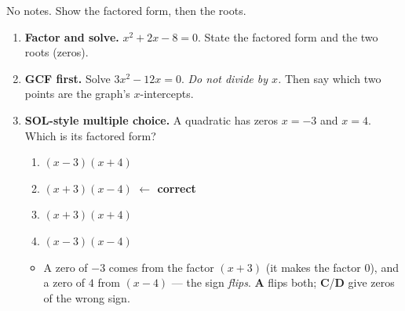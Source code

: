 \documentclass[10pt]{article}
\begin{document}

\vspace{0.12in}

No notes. Show the factored form, then the roots.

\begin{enumerate}[leftmargin=1.8em, itemsep=12pt]
  \item \textbf{Factor and solve.} $x^2+2x-8=0$. State the factored form and the two roots (zeros).
  \item \textbf{GCF first.} Solve $3x^2-12x=0$. \emph{Do not divide by $x$.} Then say which two points are
        the graph's $x$-intercepts.
  \item \textbf{SOL-style multiple choice.} A quadratic has zeros $x=-3$ and $x=4$. Which is its factored
        form?
        \begin{enumerate}[label=\Alph*., leftmargin=1.9em, itemsep=1pt]
          \item $(x-3)(x+4)$
          \item $(x+3)(x-4)$ \textcolor{keyred}{\textbf{$\leftarrow$ correct}}
          \item $(x+3)(x+4)$
          \item $(x-3)(x-4)$
        \end{enumerate}
        \begin{itemize}[leftmargin=1.4em, nosep]
          \item[] A zero of $-3$ comes from the factor $(x+3)$ (it makes the factor $0$), and a zero of $4$ from $(x-4)$ --- the sign \emph{flips}. \textbf{A} flips both; \textbf{C}/\textbf{D} give zeros of the wrong sign.
        \end{itemize}
\end{enumerate}
\end{document}

